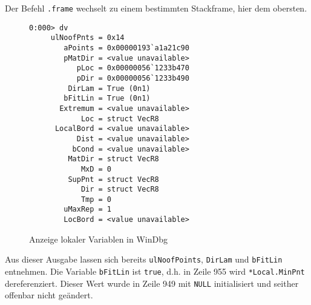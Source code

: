 Der Befehl \verb|.frame| wechselt zu einem bestimmten Stackframe, hier dem obersten.

\begin{figure}[H]
\begin{lstlisting}
0:000> dv
     ulNoofPnts = 0x14
        aPoints = 0x00000193`a1a21c90
        pMatDir = <value unavailable>
           pLoc = 0x00000056`1233b470
           pDir = 0x00000056`1233b490
         DirLam = True (0n1)
        bFitLin = True (0n1)
       Extremum = <value unavailable>
            Loc = struct VecR8
      LocalBord = <value unavailable>
           Dist = <value unavailable>
          bCond = <value unavailable>
         MatDir = struct VecR8
            MxD = 0
         SupPnt = struct VecR8
            Dir = struct VecR8
            Tmp = 0
        uMaxRep = 1
        LocBord = <value unavailable>
\end{lstlisting}
\caption{Anzeige lokaler Variablen in WinDbg}
\end{figure}

Aus dieser Ausgabe lassen sich bereits \verb|ulNoofPoints|, \verb|DirLam| und \verb|bFitLin| entnehmen.
Die Variable \verb|bFitLin| ist \verb|true|, d.h. in Zeile 955 wird \verb|*Local.MinPnt| dereferenziert. Dieser Wert wurde in Zeile 949 mit \verb|NULL| initialisiert und seither offenbar nicht geändert.

